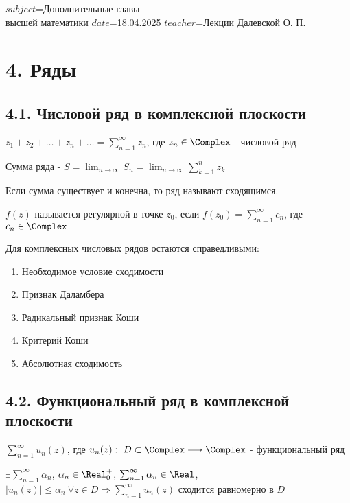 $subject$=Дополнительные главы \\ высшей математики
$date$=18.04.2025
$teacher$=Лекции Далевской О. П.


\section{4. Ряды}

\subsection{4.1. Числовой ряд в комплексной плоскости}

\hypertarget{complex_series}{}

 $z_1 + z_2 + \dots + z_n + \dots = \sum_{n = 1}^\infty z_n$, где $z_n \in \Complex$ - числовой ряд

 Сумма ряда - $S = \lim_{n \to \infty} S_n = \lim_{n \to \infty} \sum_{k = 1}^n z_k$

Если сумма существует и конечна, то ряд называют сходящимся. 

\Def $f(z)$ называется регулярной в точке $z_0$, если $f(z_0) = \sum_{n = 1}^\infty c_n$, где $c_n \in \Complex$

\Nota Для комплексных числовых рядов остаются справедливыми:

\begin{enumerate}
    \item Необходимое условие сходимости
    \item Признак Даламбера
    \item Радикальный признак Коши
    \item Критерий Коши
    \item Абсолютная сходимость
\end{enumerate}

\subsection{4.2. Функциональный ряд в комплексной плоскости}

\Def $\sum_{n = 1}^\infty u_n(z)$, где $u_n(z) : \ D \subset \Complex \longrightarrow \Complex$ - функциональный ряд

\begin{MyTheorem}

    $\exists \sum_{n = 1}^\infty \alpha_n$, $\alpha_n \in \Real_0^+$, $\sum_{n = 1}^\infty \alpha_n \in \Real$,
    $|u_n(z)| \leq \alpha_n \ \forall z \in D \Longrightarrow \sum_{n = 1}^\infty u_n(z)$ сходится равномерно в $D$
\end{MyTheorem}

